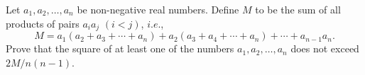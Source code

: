Let $a_1,a_2,\ldots,a_n$ be non-negative real numbers. Define $M$ to be the sum of all products of pairs $a_ia_j$ $(i<j)$,  $\textit{i.e.}$,  \[ M = a_1(a_2+a_3+\cdots+a_n)+a_2(a_3+a_4+\cdots+a_n)+\cdots+a_{n-1}a_n.  \] Prove that the square of at least one of the numbers $a_1,a_2,\ldots,a_n$ does not exceed $2M/n(n-1)$.